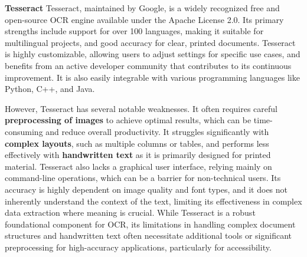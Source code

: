 \textbf{Tesseract}
Tesseract, maintained by Google, is a widely recognized free and open-source OCR engine available under the Apache License 2.0. Its primary strengths include support for over 100 languages, making it suitable for multilingual projects, and good accuracy for clear, printed documents. Tesseract is highly customizable, allowing users to adjust settings for specific use cases, and benefits from an active developer community that contributes to its continuous improvement. It is also easily integrable with various programming languages like Python, C++, and Java.

However, Tesseract has several notable weaknesses. It often requires careful \textbf{preprocessing of images} to achieve optimal results, which can be time-consuming and reduce overall productivity. It struggles significantly with \textbf{complex layouts}, such as multiple columns or tables, and performs less effectively with \textbf{handwritten text} as it is primarily designed for printed material. Tesseract also lacks a graphical user interface, relying mainly on command-line operations, which can be a barrier for non-technical users. Its accuracy is highly dependent on image quality and font types, and it does not inherently understand the context of the text, limiting its effectiveness in complex data extraction where meaning is crucial. While Tesseract is a robust foundational component for OCR, its limitations in handling complex document structures and handwritten text often necessitate additional tools or significant preprocessing for high-accuracy applications, particularly for accessibility.

